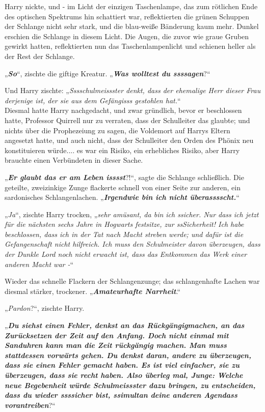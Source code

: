 {Harry nickte, und - im Licht der einzigen Taschenlampe, das zum rötlichen Ende des optischen Spektrums hin schattiert war, reflektierten die grünen Schuppen der Schlange nicht sehr stark, und die blau-weiße Bänderung kaum mehr. Dunkel erschien die Schlange in diesem Licht. Die Augen, die zuvor wie graue Gruben gewirkt hatten, reflektierten nun das Taschenlampenlicht und schienen heller als der Rest der Schlange.

„\textbf{\emph{So}}“, zischte die giftige Kreatur. „\textbf{\emph{Was wolltest du ssssagen}}?“

Und Harry zischte: „\emph{Sssschulmeissster denkt, dass der ehemalige Herr dieser Frau derjenige ist, der sie aus dem Gefängisss gestohlen hat.}“\\ Diesmal hatte Harry nachgedacht, und zwar gründlich, bevor er beschlossen hatte, Professor Quirrell nur zu verraten, dass der Schulleiter das glaubte; und nichts über die Prophezeiung zu sagen, die Voldemort auf Harrys Eltern angesetzt hatte, und auch nicht, dass der Schulleiter den Orden des Phönix neu konstituieren würde.... es war ein Risiko, ein erhebliches Risiko, aber Harry brauchte einen Verbündeten in dieser Sache.

„\textbf{\emph{Er glaubt das er am Leben isssst}}?!“, sagte die Schlange schließlich. Die geteilte, zweizinkige Zunge flackerte schnell von einer Seite zur anderen, ein sardonisches Schlangenlachen. „\textbf{\emph{Irgendwie bin ich nicht überasssscht.}}“

„\emph{Ja}“, zischte Harry trocken, „\emph{sehr amüsant, da bin ich ssicher. Nur dass ich jetzt für die nächsten sechs Jahre in Hogwarts festsitze, zur ssSicherheit! Ich habe beschlossen, dass ich in der Tat nach Macht streben werde; und dafür ist die Gefangenschaft nicht hilfreich. Ich muss den Schulmeister davon überzeugen, dass der Dunkle Lord noch nicht erwacht ist, dass das Entkommen das Werk einer anderen Macht war -}“

Wieder das schnelle Flackern der Schlangenzunge; das schlangenhafte Lachen war diesmal stärker, trockener. „\textbf{\emph{Amateurhafte Narrheit}}.“

„\emph{Pardon}?“, zischte Harry.

„\textbf{\emph{Du siehst einen Fehler, denkst an das Rückgängigmachen, an das Zurücksetzen der Zeit auf den Anfang. Doch nicht einmal mit Sanduhren kann man die Zeit rückgängig machen. Man muss stattdessen vorwärts gehen. Du denkst daran, andere zu überzeugen, dass sie einen Fehler gemacht haben. Es ist viel einfacher, sie zu überzeugen, dass sie recht haben. Also überleg mal, Junge: Welche neue Begebenheit würde Schulmeissster dazu bringen, zu entscheiden, dass du wieder ssssicher bist, ssimultan deine anderen Agendass vorantreiben}}?“

}
